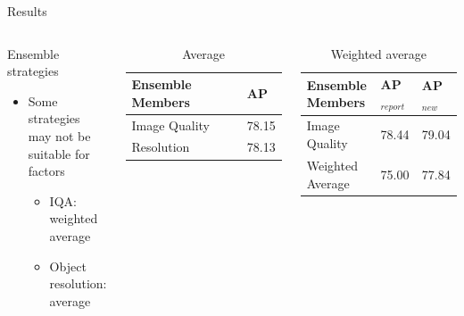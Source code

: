 \begin{frame}{Results}{}
\begin{columns}
    \begin{block}{Ensemble strategies}
    \begin{itemize}
        \item Some strategies may not be suitable for factors
        \begin{itemize}
            \item IQA: weighted average
            \item Object resolution: average
        \end{itemize}    
    \end{itemize}  
    

\end{block} 
    \begin{table}[h]
    \centering
    \caption{Average}
    \begin{tabular}{|l|l|}
    \hline
    \textbf{Ensemble Members}        & \textbf{AP} \\ \hline
    Image Quality & 78.15 \\ \hline
    Resolution    & 78.13 \\ \hline
    \end{tabular}
    \end{table}

    \begin{table}[]
    \centering
    \caption{Weighted average}
    \begin{tabular}{|l|l|l|}
    \hline
     \textbf{Ensemble Members} &  \textbf{AP$_{report}$} & \textbf{AP$_{new}$} \\ \hline
    Image Quality                                              & 78.44     & 79.04  \\ \hline
    Weighted Average                                           & 75.00     & 77.84  \\ \hline
    \end{tabular}
    \end{table}

\end{columns}
\end{frame}


